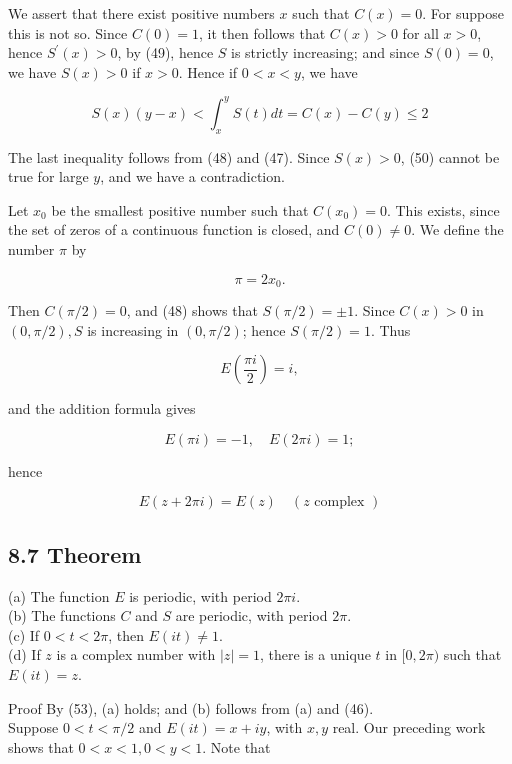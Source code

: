 \documentclass[10pt]{article}
\begin{document}
We assert that there exist positive numbers $x$ such that $C(x)=0$. For suppose this is not so. Since $C(0)=1$, it then follows that $C(x)>0$ for all $x>0$, hence $S^{\prime}(x)>0$, by (49), hence $S$ is strictly increasing; and since $S(0)=0$, we have $S(x)>0$ if $x>0$. Hence if $0<x<y$, we have


\begin{equation*}
S(x)(y-x)<\int_{x}^{y} S(t) d t=C(x)-C(y) \leq 2 \tag{50}
\end{equation*}


The last inequality follows from (48) and (47). Since $S(x)>0$, (50) cannot be true for large $y$, and we have a contradiction.

Let $x_{0}$ be the smallest positive number such that $C\left(x_{0}\right)=0$. This exists, since the set of zeros of a continuous function is closed, and $C(0) \neq 0$. We define the number $\pi$ by


\begin{equation*}
\pi=2 x_{0} . \tag{51}
\end{equation*}


Then $C(\pi / 2)=0$, and (48) shows that $S(\pi / 2)= \pm 1$. Since $C(x)>0$ in $(0, \pi / 2), S$ is increasing in $(0, \pi / 2)$; hence $S(\pi / 2)=1$. Thus

$$
E\left(\frac{\pi i}{2}\right)=i,
$$

and the addition formula gives


\begin{equation*}
E(\pi i)=-1, \quad E(2 \pi i)=1 ; \tag{52}
\end{equation*}


hence


\begin{equation*}
E(z+2 \pi i)=E(z) \quad(z \text { complex }) \tag{53}
\end{equation*}


\subsection*{8.7 Theorem}
(a) The function $E$ is periodic, with period $2 \pi i$.\\
(b) The functions $C$ and $S$ are periodic, with period $2 \pi$.\\
(c) If $0<t<2 \pi$, then $E(i t) \neq 1$.\\
(d) If $z$ is a complex number with $|z|=1$, there is a unique $t$ in $[0,2 \pi)$ such that $E(i t)=z$.

Proof By (53), (a) holds; and (b) follows from (a) and (46).\\
Suppose $0<t<\pi / 2$ and $E(i t)=x+i y$, with $x, y$ real. Our preceding work shows that $0<x<1,0<y<1$. Note that
\end{document}
